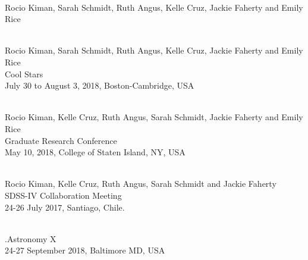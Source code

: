 \documentclass[10pt]{cv}
\begin{document}
\begin{llist}
\begin{etaremune}[leftmargin=10pt]
\item {}\\
Rocio Kiman, Sarah Schmidt, Ruth Angus, Kelle Cruz, Jackie Faherty and Emily Rice\\

\end{etaremune}

\renewcommand{\labelenumi}{A\theenumi}
\begin{etaremune}[leftmargin=10pt]

\item {}\\
Rocio Kiman, Sarah Schmidt, Ruth Angus, Kelle Cruz, Jackie Faherty and Emily Rice\\
Cool Stars \\
July 30 to August 3, 2018, Boston-Cambridge, USA 

\item {}\\
Rocio Kiman, Kelle Cruz, Ruth Angus, Sarah Schmidt, Jackie Faherty and Emily Rice\\
Graduate Research Conference \\
May 10, 2018, College of Staten Island, NY, USA %

\item {}\\
Rocio Kiman, Kelle Cruz, Ruth Angus, Sarah Schmidt and Jackie Faherty\\ 
SDSS-IV Collaboration Meeting \\
24-26 July 2017, Santiago, Chile. 

\end{etaremune}

\renewcommand{\labelenumi}{C\theenumi}
\begin{etaremune}[leftmargin=10pt]

\item {}\\
.Astronomy X \\
24-27 September 2018, Baltimore MD, USA %


\end{etaremune}
\end{llist}
\end{document}

